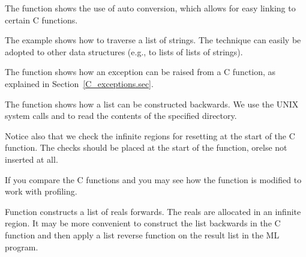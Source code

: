 \documentclass[12pt]{book}
\begin{document}
\begin{example}\label{power_auto.ex}
  The  function shows the
  use of auto conversion, which allows for easy linking to certain C functions.
\end{example}

\begin{example}\label{print_string_list.ex}
  The
  example shows how to traverse a list of strings. The technique can easily be
  adopted to other data structures (e.g., to lists of lists of strings).
\end{example}

\begin{example}\label{power_exn.ex}
  The  function shows how an
  exception can be raised from a C function, as explained in
  Section~\ref{C_exceptions.sec}.
\end{example}

\begin{example}\label{dir.ex}
  The  function shows how a list can be
  constructed backwards.  We use the UNIX system calls  and
   to read the contents of the specified directory.

  Notice also that we check the infinite regions for resetting at the
  start of the C function. The checks should be placed at the start of
  the function, orelse not inserted at all.

  If you compare the C functions  and  you may see how the
  function  is modified to work with profiling.
\end{example}

\begin{example}\label{real_list.ex}
  Function  constructs a
  list of reals forwards. The reals are allocated in an infinite region. It may
  be more convenient to construct the list backwards in the C function and then
  apply a list reverse function on the result list in the ML program.
\end{example}
\end{document}
